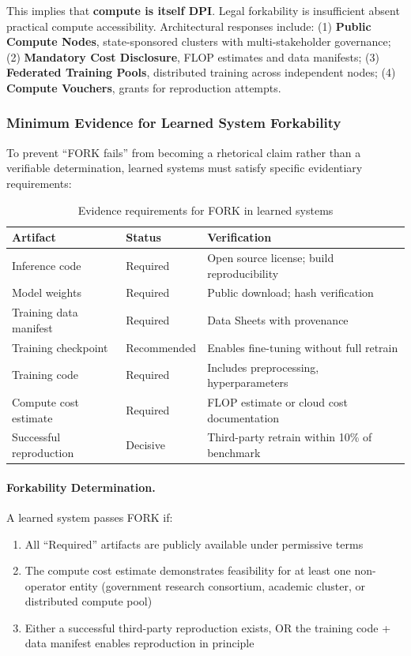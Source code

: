 \documentclass{article}
\begin{document}
This implies that \textbf{compute is itself DPI}. Legal forkability is insufficient absent practical compute accessibility. Architectural responses include: (1) \textbf{Public Compute Nodes}, state-sponsored clusters with multi-stakeholder governance; (2) \textbf{Mandatory Cost Disclosure}, FLOP estimates and data manifests; (3) \textbf{Federated Training Pools}, distributed training across independent nodes; (4) \textbf{Compute Vouchers}, grants for reproduction attempts.

\subsubsection{Minimum Evidence for Learned System Forkability}
\label{subsubsec:ai-fork-evidence}

To prevent ``FORK fails'' from becoming a rhetorical claim rather than a verifiable determination, learned systems must satisfy specific evidentiary requirements:

\begin{table}[htbp]
\centering
\small
\caption{Evidence requirements for FORK in learned systems}
\label{tab:ai-fork-evidence}
\begin{tabular}{@{}llp{6cm}@{}}
\toprule
\textbf{Artifact} & \textbf{Status} & \textbf{Verification} \\
\midrule
Inference code & Required & Open source license; build reproducibility \\
Model weights & Required & Public download; hash verification \\
Training data manifest & Required & Data Sheets \citep{gebru2021} with provenance \\
Training checkpoint & Recommended & Enables fine-tuning without full retrain \\
Training code & Required & Includes preprocessing, hyperparameters \\
Compute cost estimate & Required & FLOP estimate or cloud cost documentation \\
Successful reproduction & Decisive & Third-party retrain within 10\% of benchmark \\
\bottomrule
\end{tabular}
\end{table}

\paragraph{Forkability Determination.} A learned system passes FORK if:
\begin{enumerate}[noitemsep]
    \item All ``Required'' artifacts are publicly available under permissive terms
    \item The compute cost estimate demonstrates feasibility for at least one non-operator entity (government research consortium, academic cluster, or distributed compute pool)
    \item Either a successful third-party reproduction exists, OR the training code + data manifest enables reproduction in principle
\end{enumerate}
\end{document}
